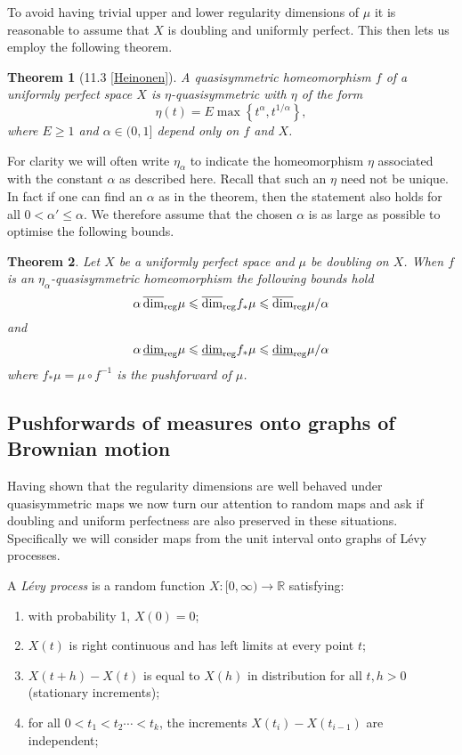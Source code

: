 \documentclass[12pt]{amsart}
\numberwithin{equation}{section}
\newtheorem{thm}{Theorem}[section]
\renewcommand{\ge}{\geqslant}
\renewcommand{\le}{\leqslant}
\newcommand{\urdim}{\overline{\dim}_{\textup{reg}}}
\newcommand{\lrdim}{\underline{\dim}_{\textup{reg}}}
\begin{document}
To avoid having trivial upper and lower regularity dimensions of $\mu$ it is reasonable to assume that $X$ is doubling and uniformly perfect. This then lets us employ the following theorem. 

\begin{thm}[11.3 \ref{Heinonen}]
A quasisymmetric homeomorphism $f$ of a uniformly perfect space $X$ is $\eta$-quasisymmetric with $\eta$ of the form
\[
\eta(t) = E \max\left\{t^\alpha, t^{1/\alpha}\right\},
\]
where $E\ge 1 $ and $\alpha \in (0,1]$ depend only on $f$ and $X$.
\end{thm}

For clarity we will often write $\eta_{\alpha}$ to indicate the homeomorphism $\eta$ associated with the constant $\alpha$ as described here. Recall that such an $\eta$ need not be unique. In fact if one can find an $\alpha$ as in the theorem, then the statement also holds for all $0< \alpha' \le \alpha$. We therefore assume that the chosen $\alpha$ is as large as possible to optimise the following bounds.

\begin{thm}
Let $X$ be a uniformly perfect space and $\mu$ be doubling on $X$. When $f$ is an $\eta_\alpha$-quasisymmetric homeomorphism the following bounds hold
\[
\alpha \, \urdim \mu \le \urdim f_{*}\mu \le \urdim \mu/\alpha
\]
and 
\[
\alpha \, \lrdim \mu \le \lrdim f_{*}\mu \le \lrdim \mu/\alpha
\]
where $f_{*}\mu = \mu \circ f^{-1}$ is the pushforward of $\mu$.
\end{thm}




\subsection{Pushforwards of measures onto graphs of Brownian motion}


Having shown that the regularity dimensions are well behaved under quasisymmetric maps we now turn our attention to random maps and ask if doubling and uniform perfectness are also preserved in these situations. Specifically we will consider maps from the unit interval onto graphs of L\'evy processes.

A \textit{L\'evy process} is a random function $X : [0,\infty) \rightarrow \mathbb{R}$ satisfying:
\begin{enumerate}
    \item with probability 1, $X(0) = 0$;
    
    \item $X(t)$ is right continuous and has left limits at every point $t$;
    
    \item $X(t+h) - X(t)$ is equal to $X(h)$ in distribution for all $t,h >0$ (stationary increments);
    
    \item for all $0<t_1 < t_2 \cdots < t_k$, the increments $X(t_i) - X(t_{i-1})$ are independent;
    
\end{enumerate}
\end{document}
